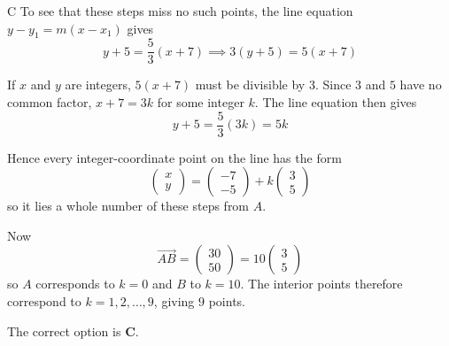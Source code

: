 \documentclass[11pt,a4paper]{article}
\begin{document}
\begin{enumerate}[label=\textbf{\arabic*.},leftmargin=*,itemsep=0pt,start=18]
\begin{djsSolution}{C}
To see that these steps miss no such points, the line equation $y-y_1=m(x-x_1)$ gives
\[
y+5=\frac53(x+7)
\implies 3(y+5)=5(x+7)
\]

If $x$ and $y$ are integers, $5(x+7)$ must be divisible by $3$. Since $3$ and $5$ have no common factor, $x+7=3k$ for some integer $k$. The line equation then gives
\[
y+5=\frac53(3k)=5k
\]

Hence every integer-coordinate point on the line has the form
\[
\begin{pmatrix}x\\y\end{pmatrix}
=
\begin{pmatrix}-7\\-5\end{pmatrix}
+k\begin{pmatrix}3\\5\end{pmatrix}
\]
so it lies a whole number of these steps from $A$.

Now
\[
\overrightarrow{AB}
=\begin{pmatrix}30\\50\end{pmatrix}
=10\begin{pmatrix}3\\5\end{pmatrix}
\]
so $A$ corresponds to $k=0$ and $B$ to $k=10$. The interior points therefore correspond to $k=1,2,\ldots,9$, giving $\boxed{9}$ points.

The correct option is \textbf{C}.
\end{djsSolution}
\end{enumerate}
\clearpage
\thispagestyle{djssolutions}
\vspace*{8pt}
\end{document}
